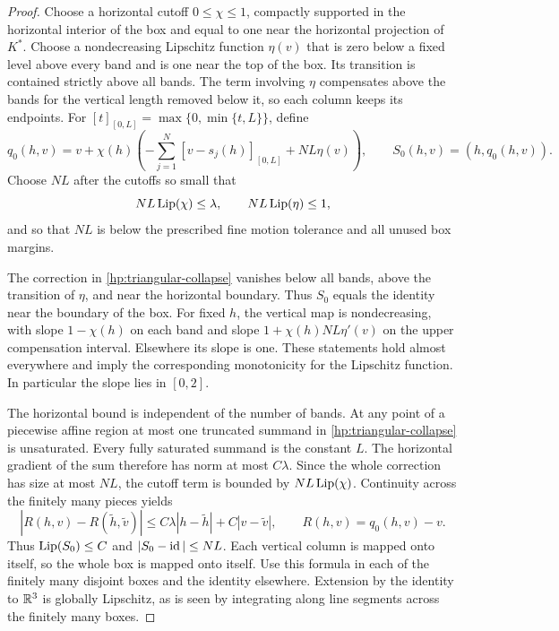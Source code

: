 \begin{proof}
Choose a horizontal cutoff $0\le\chi\le1$, compactly supported in
the horizontal interior of the box and equal to one near the
horizontal projection of $K^*$.  Choose a nondecreasing Lipschitz
function $\eta(v)$ that is zero below a fixed level above every band
and is one near the top of the box.  Its transition is contained
strictly above all bands.  The term involving $\eta$ compensates
above the bands for the vertical length removed below it, so each
column keeps its endpoints.  For
$[t]_{[0,L]}=\max\{0,\min\{t,L\}\}$, define
\begin{equation}\label{hp:triangular-collapse}
 q_0(h,v)=v+\chi(h)\left(
       -\sum_{j=1}^N[v-s_j(h)]_{[0,L]}+NL\eta(v)\right),
 \qquad S_0(h,v)=(h,q_0(h,v)).
\end{equation}
Choose $NL$ after the cutoffs so small that
\begin{equation}\label{hp:band-cutoff-smallness}
 NL\operatorname{Lip}(\chi)\le\lambda,
 \qquad NL\operatorname{Lip}(\eta)\le1,
\end{equation}
and so that $NL$ is below the prescribed fine motion tolerance and
all unused box margins.

The correction in \eqref{hp:triangular-collapse} vanishes below all
bands, above the transition of $\eta$, and near the horizontal
boundary.  Thus $S_0$ equals the identity near the boundary of the
box.  For fixed $h$, the vertical map is nondecreasing, with slope
$1-\chi(h)$ on each band and slope
$1+\chi(h)NL\eta'(v)$ on the upper compensation interval.  Elsewhere
its slope is one.  These statements hold almost everywhere and
imply the corresponding monotonicity for the Lipschitz function.
In particular the slope lies in $[0,2]$.

The horizontal bound is independent of the number of bands.  At any
point of a piecewise affine region at most one truncated summand in
\eqref{hp:triangular-collapse} is unsaturated.  Every fully saturated
summand is the constant $L$.  The horizontal gradient of the sum
therefore has norm at most $C\lambda$.  Since the whole correction
has size at most $NL$, the cutoff term is bounded by
$NL\operatorname{Lip}(\chi)$.  Continuity across the finitely many pieces yields
\begin{equation}\label{hp:anisotropic-correction}
 |R(h,v)-R(\widetilde h,\widetilde v)|
 \le C\lambda|h-\widetilde h|+C|v-\widetilde v|,
 \qquad R(h,v)=q_0(h,v)-v.
\end{equation}
Thus $\operatorname{Lip}(S_0)\le C$ and $|S_0-\operatorname{id}|\le NL$.  Each vertical
column is mapped onto itself, so the whole box is mapped onto itself.
Use this formula in each of the finitely many disjoint boxes and the
identity elsewhere.  Extension by the identity to $\mathbb R^3$ is globally
Lipschitz, as is seen by integrating along line segments across the
finitely many boxes.


\end{proof}
